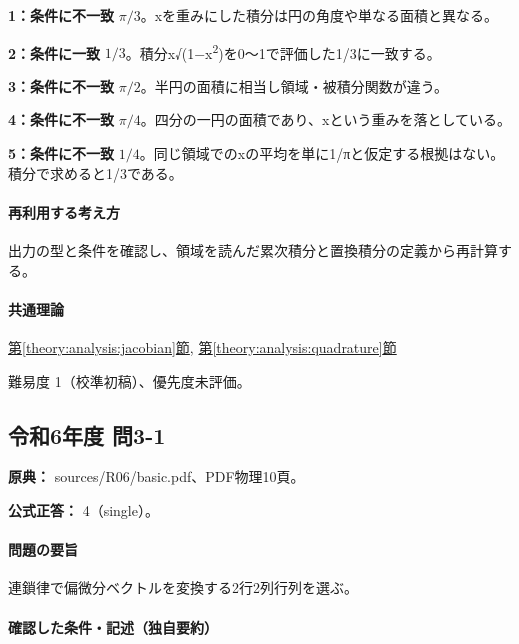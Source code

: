 \noindent\textbf{1：条件に不一致} \(\pi/3\)。xを重みにした積分は円の角度や単なる面積と異なる。\par

\noindent\textbf{2：条件に一致} \(1/3\)。積分x√(1−x\textsuperscript{2})を0〜1で評価した1/3に一致する。\par

\noindent\textbf{3：条件に不一致} \(\pi/2\)。半円の面積に相当し領域・被積分関数が違う。\par

\noindent\textbf{4：条件に不一致} \(\pi/4\)。四分の一円の面積であり、xという重みを落としている。\par

\noindent\textbf{5：条件に不一致} \(1/4\)。同じ領域でのxの平均を単に1/πと仮定する根拠はない。積分で求めると1/3である。\par

\paragraph{再利用する考え方} 出力の型と条件を確認し、領域を読んだ累次積分と置換積分の定義から再計算する。

\paragraph{共通理論} \hyperref[theory:analysis:jacobian]{第\ref*{theory:analysis:jacobian}節}, \hyperref[theory:analysis:quadrature]{第\ref*{theory:analysis:quadrature}節}

\par 難易度 1（校準初稿）、優先度未評価。

\subsection{令和6年度 問3-1}
\label{q:r06-reg-basic-3-1}

\noindent\textbf{原典：} sources/R06/basic.pdf、PDF物理10頁。

\textbf{公式正答：} 4（single）。

\paragraph{問題の要旨} 連鎖律で偏微分ベクトルを変換する2行2列行列を選ぶ。

\paragraph{確認した条件・記述（独自要約）}\mbox{}\par

